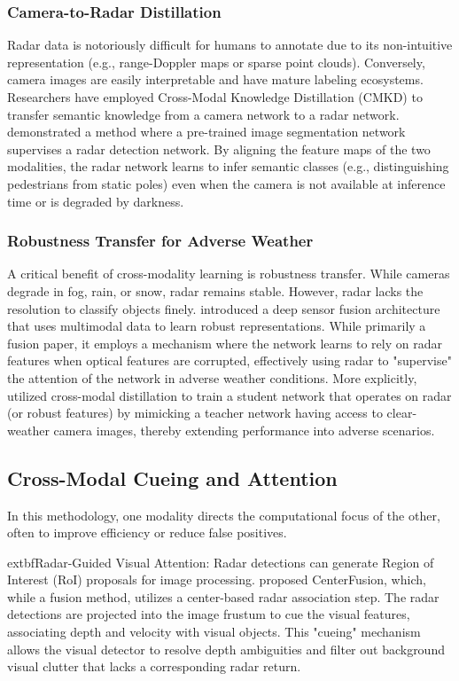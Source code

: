 \subsubsection{Camera-to-Radar Distillation}
Radar data is notoriously difficult for humans to annotate due to its non-intuitive representation (e.g., range-Doppler maps or sparse point clouds). Conversely, camera images are easily interpretable and have mature labeling ecosystems. Researchers have employed Cross-Modal Knowledge Distillation (CMKD) to transfer semantic knowledge from a camera network to a radar network.
\cite{Saha2021} demonstrated a method where a pre-trained image segmentation network supervises a radar detection network. By aligning the feature maps of the two modalities, the radar network learns to infer semantic classes (e.g., distinguishing pedestrians from static poles) even when the camera is not available at inference time or is degraded by darkness.

\subsubsection{Robustness Transfer for Adverse Weather}
A critical benefit of cross-modality learning is robustness transfer. While cameras degrade in fog, rain, or snow, radar remains stable. However, radar lacks the resolution to classify objects finely. \cite{Bijelic2020} introduced a deep sensor fusion architecture that uses multimodal data to learn robust representations. While primarily a fusion paper, it employs a mechanism where the network learns to rely on radar features when optical features are corrupted, effectively using radar to "supervise" the attention of the network in adverse weather conditions.
More explicitly, \cite{Gasperini2021} utilized cross-modal distillation to train a student network that operates on radar (or robust features) by mimicking a teacher network having access to clear-weather camera images, thereby extending performance into adverse scenarios.

\subsection{Cross-Modal Cueing and Attention}
In this methodology, one modality directs the computational focus of the other, often to improve efficiency or reduce false positives.

	extbf{Radar-Guided Visual Attention:} Radar detections can generate Region of Interest (RoI) proposals for image processing. \cite{Nabati2021} proposed CenterFusion, which, while a fusion method, utilizes a center-based radar association step. The radar detections are projected into the image frustum to cue the visual features, associating depth and velocity with visual objects. This "cueing" mechanism allows the visual detector to resolve depth ambiguities and filter out background visual clutter that lacks a corresponding radar return.

